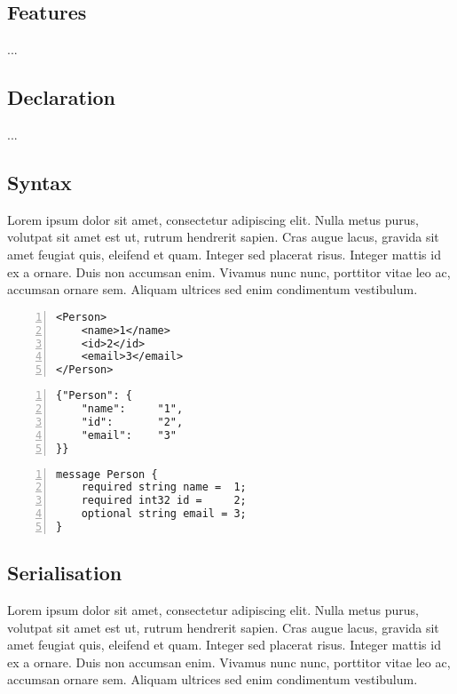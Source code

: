 \documentclass[../report.tex]{subfiles}
\begin{document}
\subsection{Features}

...

\subsection{Declaration}

...

\subsection{Syntax}

Lorem ipsum dolor sit amet, consectetur adipiscing elit. Nulla metus purus, volutpat sit amet est ut, rutrum hendrerit sapien. Cras augue lacus, gravida sit amet feugiat quis, eleifend et quam. Integer sed placerat risus. Integer mattis id ex a ornare. Duis non accumsan enim. Vivamus nunc nunc, porttitor vitae leo ac, accumsan ornare sem. Aliquam ultrices sed enim condimentum vestibulum. \\

\begin{Verbatim}[frame=single,numbers=left,framesep=5mm,label=XML Object]
<Person>
    <name>1</name>
    <id>2</id>
    <email>3</email>
</Person>
\end{Verbatim}

\vspace{1mm}

\begin{Verbatim}[frame=single,numbers=left,framesep=5mm,label=JSON Object]
{"Person": {
    "name":     "1",
    "id":       "2",
    "email":    "3"
}}
\end{Verbatim}

\vspace{1mm}

\begin{Verbatim}[frame=single,numbers=left,framesep=5mm,label=Proto Object]
message Person {
    required string name =  1;
    required int32 id =     2;
    optional string email = 3;
}
\end{Verbatim}

\subsection{Serialisation}

Lorem ipsum dolor sit amet, consectetur adipiscing elit. Nulla metus purus, volutpat sit amet est ut, rutrum hendrerit sapien. Cras augue lacus, gravida sit amet feugiat quis, eleifend et quam. Integer sed placerat risus. Integer mattis id ex a ornare. Duis non accumsan enim. Vivamus nunc nunc, porttitor vitae leo ac, accumsan ornare sem. Aliquam ultrices sed enim condimentum vestibulum.
\end{document}
